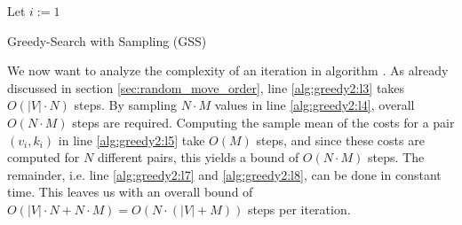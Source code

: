 \begin{algorithm}[ht]
    \SetAlgoLined
    \DontPrintSemicolon
    Let $i := 1$ \label{alg:greedy2:l1} \;
    \Return{$\idx$}  \label{alg:greedy2:l9} 
    \caption{Greedy-Search with Sampling (GSS)} \label{alg:greedy2}
\end{algorithm}

We now want to analyze the complexity of an iteration in algorithm \emph{}. As already discussed in section \ref{sec:random_move_order}, line \ref{alg:greedy2:l3} takes $O(|V|\cdot N)$ steps. By sampling $N \cdot M$ values in line \ref{alg:greedy2:l4}, overall $O(N \cdot M)$ steps are required. Computing the sample mean of the costs for a pair $(v_i,k_i)$ in line \ref{alg:greedy2:l5} take $O(M)$ steps, and since these costs are computed for $N$ different pairs, this yields a bound of $O(N \cdot M)$ steps. The remainder, i.e. line \ref{alg:greedy2:l7} and \ref{alg:greedy2:l8}, can be done in constant time. This leaves us with an overall bound of $O(|V|\cdot N + N \cdot M ) = O(N\cdot (|V|+M))$ steps per iteration.